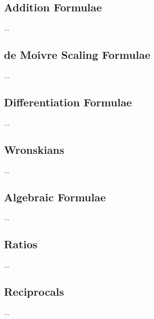 \subsection{Addition Formulae}
...
\subsection{de Moivre Scaling Formulae}
...
\subsection{Differentiation Formulae}
...
\subsection{Wronskians}
...
\subsection{Algebraic Formulae}
...
\subsection{Ratios}
...
\subsection{Reciprocals}
...